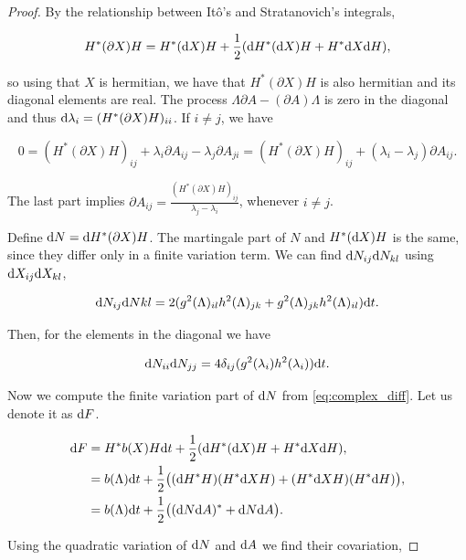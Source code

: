 \begin{proof}
    By the relationship between Itô's and Stratanovich's integrals,

    \begin{equation*}
        H^*(\partial X)H = H^*(\mathrm d X)H + \frac12(\mathrm d H^*(\mathrm d X)H + H^*\mathrm d X\mathrm d H),
    \end{equation*}

    \noindent so using that $X$ is hermitian, we have that $H^*(\partial X)H$ is also hermitian and its diagonal elements are real. The process $\Lambda \partial A - (\partial A)\Lambda$ is zero in the diagonal and thus $\mathrm d \lambda_i = (H^*(\partial X)H)_{ii}$.  If $i \neq j$, we have

    \[ 0 = (H^*(\partial X)H)_{ij} + \lambda_i\partial A_{ij} - \lambda_j \partial A_{ji} = (H^*(\partial X)H)_{ij} + (\lambda_i - \lambda_j)\partial A_{ij}. \]

    The last part implies $\partial A_{ij} = \frac{(H^*(\partial X)H)_{ij}}{\lambda_j - \lambda_i}$, whenever $i\neq j$.

    Define $\mathrm d N = \mathrm d H^*(\partial X)H$. The martingale part of $N$ and $H^*(\mathrm d X)H$ is the same, since they differ only in a finite variation term. We can find $\mathrm d N_{ij}\mathrm d N_{kl}$ using $\mathrm d X_{ij} \mathrm d X_{kl}$,

    \begin{equation*}
        \mathrm d N_{ij}\mathrm d N{kl} = 2(g^2(\Lambda)_{il}h^2(\Lambda)_{jk} + g^2(\Lambda)_{jk}h^2(\Lambda)_{il})\mathrm d t.
    \end{equation*}

    Then, for the elements in the diagonal we have

    \begin{equation}
        \mathrm d N_{ii}\mathrm d N_{jj} = 4\delta_{ij}(g^2(\lambda_i)h^2(\lambda_i))\mathrm d t.
    \end{equation}

    Now we compute the finite variation part of $\mathrm d N$ from \eqref{eq:complex_diff}. Let us denote it as $\mathrm d F$.

    \begin{align*}
        \mathrm d F &= H^*b(X)H\mathrm d t + \frac12(\mathrm d H^*(\mathrm d X)H + H^*\mathrm d X\mathrm d H),\\
             &= b(\Lambda)\mathrm d t + \frac12 \bigl((\mathrm d H^*H) (H^*\mathrm d XH) + (H^*\mathrm d X H)(H^*\mathrm d H)\bigr),\\
             &= b(\Lambda)\mathrm d t + \frac12\bigl((\mathrm d N \mathrm d A)^* + \mathrm d N \mathrm d A \bigr).
    \end{align*}

    Using the quadratic variation of $\mathrm d N$ and $\mathrm d A$ we find their covariation,


\end{proof}
